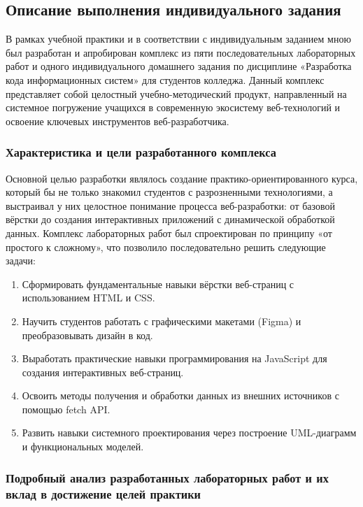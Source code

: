 \subsection{Описание выполнения индивидуального задания}

В рамках учебной практики и в соответствии с индивидуальным заданием мною был разработан и апробирован комплекс из пяти последовательных лабораторных работ и одного индивидуального домашнего задания по дисциплине «Разработка кода информационных систем» для студентов колледжа. Данный комплекс представляет собой целостный учебно-методический продукт, направленный на системное погружение учащихся в современную экосистему веб-технологий и освоение ключевых инструментов веб-разработчика.

\subsubsection{Характеристика и цели разработанного комплекса}
\begin{sloppypar}
Основной целью разработки являлось создание практико-ориентированного курса, который бы не только знакомил студентов с разрозненными технологиями, а выстраивал у них целостное понимание процесса веб-разработки: от базовой вёрстки до создания интерактивных приложений с динамической обработкой данных. Комплекс лабораторных работ был спроектирован по принципу «от простого к сложному», что позволило последовательно решить следующие задачи:
\end{sloppypar}
\begin{enumerate}
    \item Сформировать фундаментальные навыки вёрстки веб-страниц с использованием HTML и CSS.
    \item Научить студентов работать с графическими макетами (Figma) и преобразовывать дизайн в код.
    \item Выработать практические навыки программирования на JavaScript для создания интерактивных веб-страниц.
    \item Освоить методы получения и обработки данных из внешних источников с помощью fetch API.
    \item Развить навыки системного проектирования через построение UML-диаграмм и функциональных моделей.
\end{enumerate}

\subsubsection{Подробный анализ разработанных лабораторных работ и их вклад в достижение целей практики}

